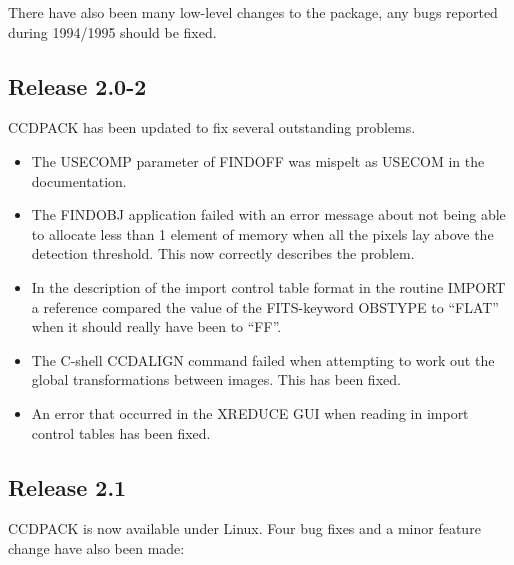 \documentclass[twoside,11pt]{article}
\newcommand{\htmlref}[2]{#1}
\renewcommand{\_}{\texttt{\symbol{95}}}
\newcommand{\xroutine}[1]{\htmlref{{\sc #1}}{#1}}
\begin{document}
There have also been many low-level changes to the package, any
bugs reported during 1994/1995 should be fixed.

\subsection{Release 2.0-2}

CCDPACK has been updated to fix several outstanding problems.
\begin{itemize}

\item The USECOMP parameter of \xroutine{FINDOFF} was mispelt as USECOM in the
documentation.

\item   The \xroutine{FINDOBJ} application failed with an error message about not
   being able to allocate less than 1 element of memory when all
   the pixels lay above the detection threshold. This now correctly
   describes the problem.

\item   In the description of the import control table format in the
   routine \xroutine{IMPORT} a reference compared the value of the FITS-keyword
   OBSTYPE to ``FLAT'' when it should really have been to ``FF''.

\item   The C-shell \xroutine{CCDALIGN} command failed when attempting to work out the
   global transformations between images. This has been fixed.

\item    An error that occurred in the \xroutine{XREDUCE} GUI when reading in import
   control tables has been fixed.
\end{itemize}

\subsection{Release 2.1}

 CCDPACK is now available under Linux. Four bug fixes and a minor feature
 change have also been made:
\end{document}
